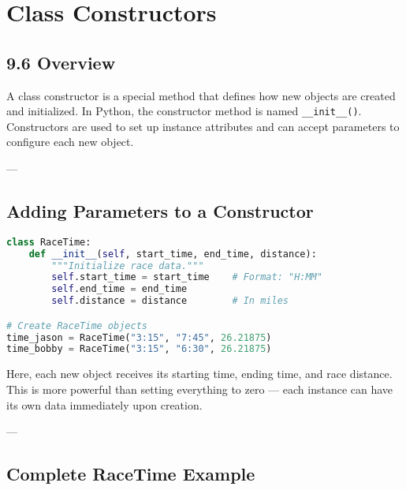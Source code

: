 \chapter{Class Constructors}
\label{ch:class_constructors}

\section{9.6 Overview}
A class constructor is a special method that defines how new objects are created and initialized.
In Python, the constructor method is named \texttt{\_\_init\_\_()}.
Constructors are used to set up instance attributes and can accept parameters to configure each new object.

---

\section{Adding Parameters to a Constructor}

\begin{lstlisting}[language=Python, caption={A simple constructor with parameters.}]
class RaceTime:
    def __init__(self, start_time, end_time, distance):
        """Initialize race data."""
        self.start_time = start_time    # Format: "H:MM"
        self.end_time = end_time
        self.distance = distance        # In miles

# Create RaceTime objects
time_jason = RaceTime("3:15", "7:45", 26.21875)
time_bobby = RaceTime("3:15", "6:30", 26.21875)
\end{lstlisting}

Here, each new object receives its starting time, ending time, and race distance.
This is more powerful than setting everything to zero — each instance can have its own data immediately upon creation.

---

\section{Complete RaceTime Example}

